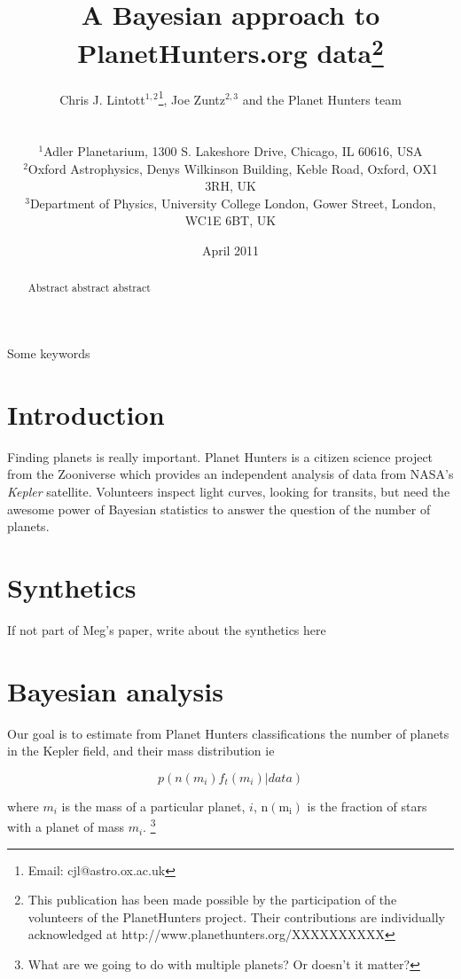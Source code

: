 \documentclass[useAMS,usenatbib,a4paper]{mn2e}
\title[Bayesian Planet Hunting]{A Bayesian approach to PlanetHunters.org data\thanks{This publication has been made possible by the participation of the volunteers of the PlanetHunters project. Their contributions are individually acknowledged at http://www.planethunters.org/XXXXXXXXXX}}
\author[Lintott et al.]{
\parbox[t]{16cm}{Chris J. Lintott$^{1,2}$\thanks{Email: cjl@astro.ox.ac.uk}, Joe Zuntz$^{2,3}$ and the Planet Hunters team\\}\\ 
$^{1}$Adler Planetarium, 1300 S. Lakeshore Drive, Chicago, IL 60616, USA\\
$^{2}$Oxford Astrophysics, Denys Wilkinson Building, Keble Road, Oxford, OX1 3RH, UK\\
$^{3}$Department of Physics, University College London, Gower Street, London, WC1E 6BT, UK\\
}
\begin{document}
\date{April 2011}
\pagerange{\pageref{firstpage}--\pageref{lastpage}} 

\maketitle

\label{firstpage}

\begin{abstract}
Abstract abstract abstract

\end{abstract}

\begin{keywords}
Some keywords
\end{keywords}

\section{Introduction}

Finding planets is really important. Planet Hunters is a citizen science project from the Zooniverse which provides an independent analysis of data from NASA's \emph{Kepler} satellite. Volunteers inspect light curves, looking for transits, but need the awesome power of Bayesian statistics to answer the question of the number of planets. 

\section{Synthetics}

If not part of Meg's paper, write about the synthetics here

\section{Bayesian analysis}

Our goal is to estimate from Planet Hunters classifications the number of planets in the Kepler field, and their mass distribution ie

\begin{equation}
p\left(n\left(m_i\right)f_t\left(m_i\right)|data\right)
\end{equation}

where $m_i$ is the mass of a particular planet, $i$, $\mathrm{n\left(m_i\right)}$ is the fraction of stars with a planet of mass $m_i$. \footnote{What are we going to do with multiple planets? Or doesn't it matter?}
\end{document}
